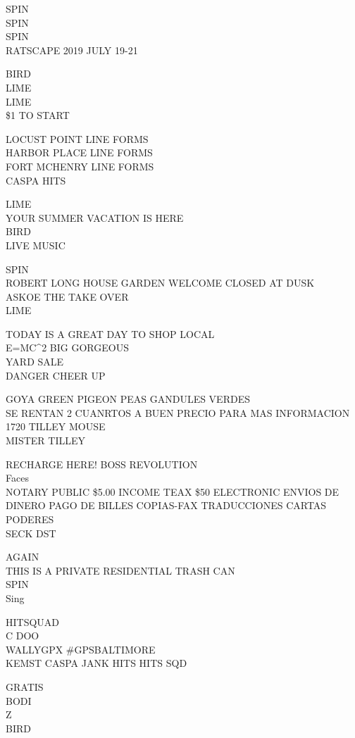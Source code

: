 \documentclass[10pt,letterpaper]{article}
\begin{document}
SPIN\\
SPIN\\
SPIN\\
RATSCAPE 2019 JULY 19{-}21

BIRD\\
LIME\\
LIME\\
\$1 TO START

LOCUST POINT LINE FORMS\\
HARBOR PLACE LINE FORMS\\
FORT MCHENRY LINE FORMS\\
CASPA HITS

LIME\\
YOUR SUMMER VACATION IS HERE\\
BIRD\\
LIVE MUSIC

SPIN\\
ROBERT LONG HOUSE GARDEN WELCOME CLOSED AT DUSK\\
ASKOE THE TAKE OVER\\
LIME

TODAY IS A GREAT DAY TO SHOP LOCAL\\
E=MC\^{}2 BIG GORGEOUS\\
YARD SALE\\
DANGER CHEER UP

GOYA GREEN PIGEON PEAS GANDULES VERDES\\
SE RENTAN 2 CUANRTOS A BUEN PRECIO PARA MAS INFORMACION\\
1720 TILLEY MOUSE\\
MISTER TILLEY

RECHARGE HERE!  BOSS REVOLUTION\\
Faces\\
NOTARY PUBLIC \$5.00 INCOME TEAX \$50 ELECTRONIC ENVIOS DE DINERO PAGO DE BILLES COPIAS{-}FAX TRADUCCIONES CARTAS PODERES\\
SECK DST

AGAIN\\
THIS IS A PRIVATE RESIDENTIAL TRASH CAN\\
SPIN\\
Sing

HITSQUAD\\
C DOO\\
WALLYGPX \#GPSBALTIMORE\\
KEMST CASPA JANK HITS HITS SQD

GRATIS\\
BODI\\
Z\\
BIRD
\end{document}
